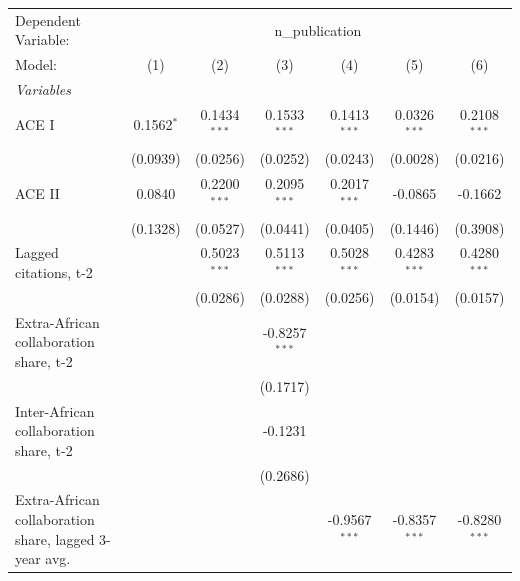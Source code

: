 
\begingroup
\centering
\begin{tabular}{lcccccc}
   \tabularnewline \midrule \midrule
   Dependent Variable: & \multicolumn{6}{c}{n\_publication}\\
   Model:                                                & (1)          & (2)            & (3)             & (4)             & (5)             & (6)\\  
   \midrule
   \emph{Variables}\\
   ACE I                                                 & 0.1562$^{*}$ & 0.1434$^{***}$ & 0.1533$^{***}$  & 0.1413$^{***}$  & 0.0326$^{***}$  & 0.2108$^{***}$\\   
                                                         & (0.0939)     & (0.0256)       & (0.0252)        & (0.0243)        & (0.0028)        & (0.0216)\\   
   ACE II                                                & 0.0840       & 0.2200$^{***}$ & 0.2095$^{***}$  & 0.2017$^{***}$  & -0.0865         & -0.1662\\   
                                                         & (0.1328)     & (0.0527)       & (0.0441)        & (0.0405)        & (0.1446)        & (0.3908)\\   
   Lagged citations, t-2                                 &              & 0.5023$^{***}$ & 0.5113$^{***}$  & 0.5028$^{***}$  & 0.4283$^{***}$  & 0.4280$^{***}$\\   
                                                         &              & (0.0286)       & (0.0288)        & (0.0256)        & (0.0154)        & (0.0157)\\   
   Extra-African collaboration share, t-2                &              &                & -0.8257$^{***}$ &                 &                 &   \\   
                                                         &              &                & (0.1717)        &                 &                 &   \\   
   Inter-African collaboration share, t-2                &              &                & -0.1231         &                 &                 &   \\   
                                                         &              &                & (0.2686)        &                 &                 &   \\   
   Extra-African collaboration share, lagged 3-year avg. &              &                &                 & -0.9567$^{***}$ & -0.8357$^{***}$ & -0.8280$^{***}$\\   

\end{tabular}
